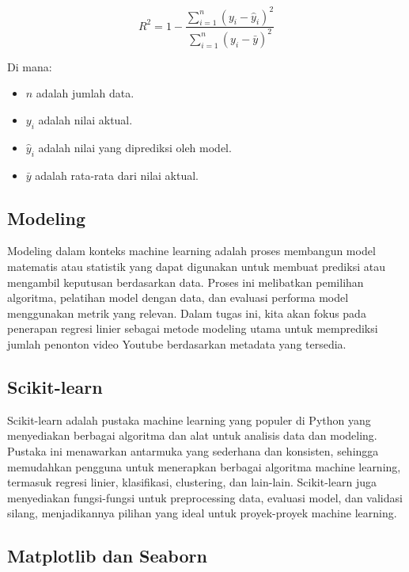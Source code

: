 \begin{equation}
    R^2 = 1 - \frac{\sum_{i=1}^{n} (y_i - \hat{y}_i)^2}{\sum_{i=1}^{n} (y_i - \bar{y})^2}
\end{equation}

Di mana:
\begin{itemize}
    \item $n$ adalah jumlah data.
    \item $y_i$ adalah nilai aktual.
    \item $\hat{y}_i$ adalah nilai yang diprediksi oleh model.
    \item $\bar{y}$ adalah rata-rata dari nilai aktual.
\end{itemize}

\subsection{Modeling}
Modeling dalam konteks machine learning adalah proses membangun model matematis atau statistik yang dapat digunakan untuk membuat prediksi atau mengambil keputusan berdasarkan data. Proses ini melibatkan pemilihan algoritma, pelatihan model dengan data, dan evaluasi performa model menggunakan metrik yang relevan. Dalam tugas ini, kita akan fokus pada penerapan regresi linier sebagai metode modeling utama untuk memprediksi jumlah penonton video Youtube berdasarkan metadata yang tersedia.

\subsection{Scikit-learn}
Scikit-learn adalah pustaka machine learning yang populer di Python yang menyediakan berbagai algoritma dan alat untuk analisis data dan modeling. Pustaka ini menawarkan antarmuka yang sederhana dan konsisten, sehingga memudahkan pengguna untuk menerapkan berbagai algoritma machine learning, termasuk regresi linier, klasifikasi, clustering, dan lain-lain. Scikit-learn juga menyediakan fungsi-fungsi untuk preprocessing data, evaluasi model, dan validasi silang, menjadikannya pilihan yang ideal untuk proyek-proyek machine learning.

\subsection{Matplotlib dan Seaborn}

